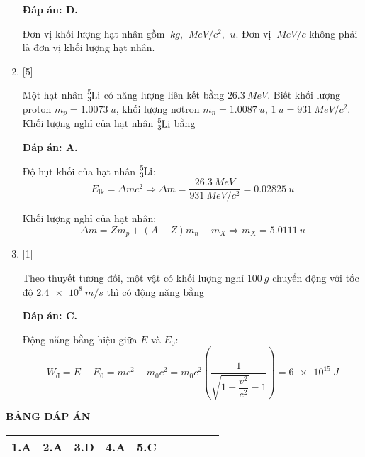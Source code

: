 \begin{enumerate}[label=\bfseries Câu \arabic*:]
\loigiai
{		\textbf{Đáp án: D.}
	
	Đơn vị khối lượng hạt nhân gồm $\SI{}{kg}$, $\SI{}{MeV/c^2}$, $\SI{}{u}$. Đơn vị $\SI{}{MeV/c}$ không phải là đơn vị khối lượng hạt nhân.
	
}
	
	\item {} [5]
	
	\cauhoi
	{Một hạt nhân $\ce{^5_3 Li}$ có năng lượng liên kết bằng $\SI{26.3}{MeV}$. Biết khối lượng proton $m_p=\SI{1.0073}{u}$, khối lượng nơtron $m_n=\SI{1.0087}{u}$, $\SI{1}{u}=\SI{931}{MeV/c^2}$. Khối lượng nghỉ của hạt nhân $\ce{^5_3 Li}$ bằng
	}
	
	\loigiai
	{		\textbf{Đáp án: A.}
		
		Độ hụt khối của hạt nhân $\ce{^5_3 Li}$:
		$$E_\text{lk} = \Delta m c^2 \Rightarrow \Delta m = \dfrac{\SI{26.3}{MeV}}{\SI{931}{MeV/c^2}} = \SI{0.02825}{u}$$
		
		Khối lượng nghỉ của hạt nhân:
		$$\Delta m = Z m_p + (A-Z)m_n - m_X \Rightarrow m_X = \SI{5.0111}{u}$$
		
	}
	
	\item {} [1]
	
	\cauhoi
	{Theo thuyết tương đối, một vật có khối lượng nghỉ $\SI{100}{g}$ chuyển động với tốc độ $\SI{2.4e8}{m/s}$ thì có động năng bằng
	}
	
	\loigiai
	{		\textbf{Đáp án: C.}
		
		Động năng bằng hiệu giữa $E$ và $E_0$:
		$$W_\text{đ} = E-E_0 = mc^2 - m_0 c^2 = m_0 c^2 \left(\dfrac{1}{\sqrt{1-\dfrac{v^2}{c^2}}-1}\right) = \SI{6e15}{J}$$
		
	}
	

	
\end{enumerate}

\loigiai
{
	\begin{center}
		\textbf{BẢNG ĐÁP ÁN}
	\end{center}
	\begin{center}
		\begin{tabular}{|m{2.8em}|m{2.8em}|m{2.8em}|m{2.8em}|m{2.8em}|m{2.8em}|m{2.8em}|m{2.8em}|m{2.8em}|m{2.8em}|}
			\hline
			1.A  & 2.A  & 3.D  & 4.A  & 5.C  & & & & & \\
			\hline
			
		\end{tabular}
	\end{center}
}

\whiteBGstarEnd